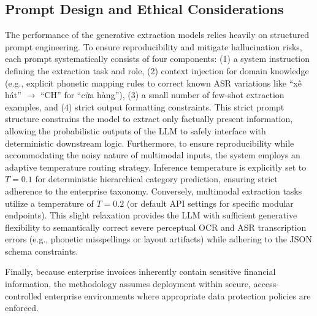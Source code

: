 \subsection{Prompt Design and Ethical Considerations}
The performance of the generative extraction models relies heavily on structured prompt engineering. To ensure reproducibility and mitigate hallucination risks, each prompt systematically consists of four components: (1) a system instruction defining the extraction task and role, (2) context injection for domain knowledge (e.g., explicit phonetic mapping rules to correct known ASR variations like ``xê hát'' $\rightarrow$ ``CH'' for ``cửa hàng''), (3) a small number of few-shot extraction examples, and (4) strict output formatting constraints. This strict prompt structure constrains the model to extract only factually present information, allowing the probabilistic outputs of the LLM to safely interface with deterministic downstream logic.
Furthermore, to ensure reproducibility while accommodating the noisy nature of multimodal inputs, the system employs an adaptive temperature routing strategy. Inference temperature is explicitly set to $T=0.1$ for deterministic hierarchical category prediction, ensuring strict adherence to the enterprise taxonomy. Conversely, multimodal extraction tasks utilize a temperature of $T=0.2$ (or default API settings for specific modular endpoints). This slight relaxation provides the LLM with sufficient generative flexibility to semantically correct severe perceptual OCR and ASR transcription errors (e.g., phonetic misspellings or layout artifacts) while adhering to the JSON schema constraints.

Finally, because enterprise invoices inherently contain sensitive financial information, the methodology assumes deployment within secure, access-controlled enterprise environments where appropriate data protection policies are enforced.
